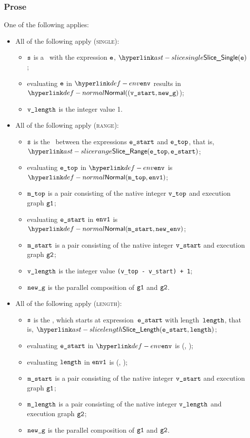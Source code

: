 \subsubsection{Prose}
One of the following applies:
\begin{itemize}
  \item All of the following apply (\textsc{single}):
  \begin{itemize}
    \item $\texttt{s}$ is a \singleslice\ with the expression $\texttt{e}$, $\SliceSingle(\ve)$;
    \item evaluating $\texttt{e}$ in $\env$ results in $\Normal((\vstart, \newg)$\newenv)\ProseOrAbnormal;
    \item $\texttt{v\_length}$ is the integer value 1.
  \end{itemize}

  \item All of the following apply (\textsc{range}):
  \begin{itemize}
    \item $\texttt{s}$ is the \rangeslice\ between the
      expressions $\texttt{e\_start}$ and $\texttt{e\_top}$, that is, \\ $\SliceRange(\etop, \estart)$;
    \item evaluating $\texttt{e\_top}$ in $\env$ is $\Normal(\mtop, \envone)$\ProseOrAbnormal;
    \item $\texttt{m\_top}$ is a pair consisting of the native integer $\texttt{v\_top}$ and execution graph $\texttt{g1}$;
    \item evaluating $\texttt{e\_start}$ in $\texttt{env1}$ is $\Normal(\mstart, \newenv)$\ProseOrAbnormal;
    \item $\texttt{m\_start}$ is a pair consisting of the native integer $\texttt{v\_start}$ and execution graph $\texttt{g2}$;
    \item $\texttt{v\_length}$ is the integer value \texttt{(v\_top - v\_start) + 1};
    \item $\texttt{new\_g}$ is the parallel composition of $\texttt{g1}$ and $\texttt{g2}$.
  \end{itemize}

  \item All of the following apply (\textsc{length}):
  \begin{itemize}
    \item $\texttt{s}$ is the \lengthslice, which starts at expression~$\texttt{e\_start}$ with length~$\texttt{length}$,
    that is, $\SliceLength(\estart, \elength)$;
    \item evaluating $\texttt{e\_start}$ in $\env$ is \Normal(\mstart, \envone)\ProseOrAbnormal;
    \item evaluating $\texttt{length}$ in $\texttt{env1}$ is \Normal(\mlength, \newenv)\ProseOrAbnormal;
    \item $\texttt{m\_start}$ is a pair consisting of the native integer $\texttt{v\_start}$ and execution graph $\texttt{g1}$;
    \item $\texttt{m\_length}$ is a pair consisting of the native integer $\texttt{v\_length}$ and execution graph $\texttt{g2}$;
    \item $\texttt{new\_g}$ is the parallel composition of $\texttt{g1}$ and $\texttt{g2}$.
  \end{itemize}


\end{itemize}
